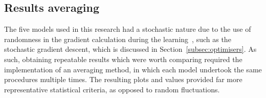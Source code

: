 \subsection{Results averaging} \label{subsec:avg}
%
The five models used in this research had a stochastic nature due to the use of randomness in the  gradient calculation during the learning~\cite{alma991010036879604001}, such as the stochastic gradient descent, which is discussed in Section~\ref{subsec:optimisers}.
As such, obtaining repeatable results which were worth comparing required the implementation of an averaging method, in which each model undertook the same procedures multiple times.
The resulting plots and values provided far more representative statistical criteria, as opposed to random fluctuations.

